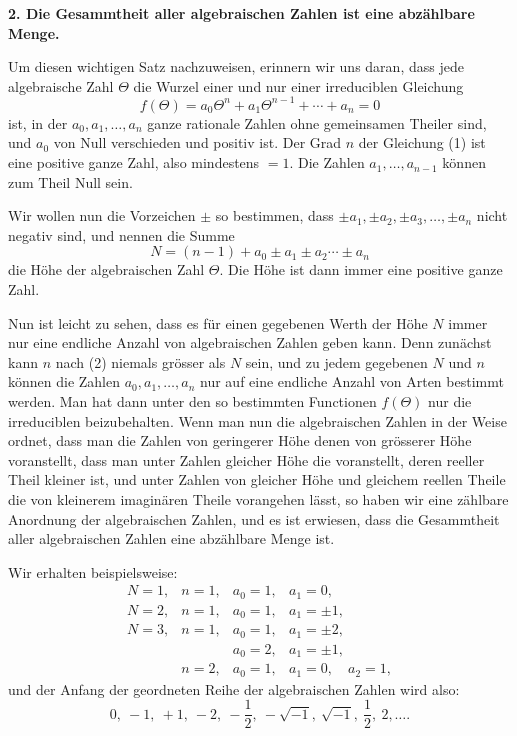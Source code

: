 \documentclass[11pt]{article}
\begin{document}
\textbf{2. Die Gesammtheit aller algebraischen Zahlen ist eine abzählbare Menge.}

Um diesen wichtigen Satz nachzuweisen, erinnern wir uns daran, dass jede algebraische Zahl $\Theta$ die Wurzel einer und nur einer irreduciblen Gleichung
\begin{equation}\tag{1}
f(\Theta)=a_0\Theta^n+a_1\Theta^{n-1}+\cdots+a_n=0
\end{equation}
ist, in der $a_0,a_1,\ldots,a_n$ ganze rationale Zahlen ohne gemeinsamen Theiler sind, und $a_0$ von Null verschieden und positiv ist. Der Grad $n$ der Gleichung (1) ist eine positive ganze Zahl, also mindestens $=1$. Die Zahlen $a_1,\ldots,a_{n-1}$ können zum Theil Null sein.

Wir wollen nun die Vorzeichen $\pm$ so bestimmen, dass $\pm a_1,\pm a_2,\pm a_3,\ldots,\pm a_n$ nicht negativ sind, und nennen die Summe
\begin{equation}\tag{2}
N=(n-1)+a_0\pm a_1\pm a_2\cdots\pm a_n
\end{equation}
die Höhe der algebraischen Zahl $\Theta$. Die Höhe ist dann immer eine positive ganze Zahl.

Nun ist leicht zu sehen, dass es für einen gegebenen Werth der Höhe $N$ immer nur eine endliche Anzahl von algebraischen Zahlen geben kann. Denn zunächst kann $n$ nach (2) niemals grösser als $N$ sein, und zu jedem gegebenen $N$ und $n$ können die Zahlen $a_0,a_1,\ldots,a_n$ nur auf eine endliche Anzahl von Arten bestimmt werden. Man hat dann unter den so bestimmten Functionen $f(\Theta)$ nur die irreduciblen beizubehalten. Wenn man nun die algebraischen Zahlen in der Weise ordnet, dass man die Zahlen von geringerer Höhe denen von grösserer Höhe voranstellt, dass man unter Zahlen gleicher Höhe die voranstellt, deren reeller Theil kleiner ist, und unter Zahlen von gleicher Höhe und gleichem reellen Theile die von kleinerem imaginären Theile vorangehen lässt, so haben wir eine zählbare Anordnung der algebraischen Zahlen, und es ist erwiesen, dass die Gesammtheit aller algebraischen Zahlen eine abzählbare Menge ist.

Wir erhalten beispielsweise:
\[
\begin{array}{llll}
N=1, & n=1, & a_0=1, & a_1=0,\\
N=2, & n=1, & a_0=1, & a_1=\pm1,\\
N=3, & n=1, & a_0=1, & a_1=\pm2,\\
     &      & a_0=2, & a_1=\pm1,\\
     & n=2, & a_0=1, & a_1=0,\quad a_2=1,
\end{array}
\]
und der Anfang der geordneten Reihe der algebraischen Zahlen wird also:
\[
0,\ -1,\ +1,\ -2,\ -\frac12,\ -\sqrt{-1},\ \sqrt{-1},\ \frac12,\ 2,\ldots .
\]
\end{document}

